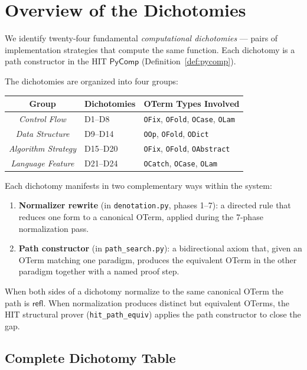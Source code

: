 \chapter{Overview of the Dichotomies}
\label{ch:dichotomy-overview}

We identify twenty-four fundamental \emph{computational dichotomies}
--- pairs of implementation strategies that compute the same function.
Each dichotomy is a path constructor in the HIT $\mathsf{PyComp}$
(Definition~\ref{def:pycomp}).

The dichotomies are organized into four groups:

\begin{center}
\begin{tabular}{c l l}
  \textbf{Group} & \textbf{Dichotomies} & \textbf{OTerm Types Involved} \\
  \hline
  \emph{Control Flow} & D1--D8 & \texttt{OFix}, \texttt{OFold}, \texttt{OCase}, \texttt{OLam} \\
  \emph{Data Structure} & D9--D14 & \texttt{OOp}, \texttt{OFold}, \texttt{ODict} \\
  \emph{Algorithm Strategy} & D15--D20 & \texttt{OFix}, \texttt{OFold}, \texttt{OAbstract} \\
  \emph{Language Feature} & D21--D24 & \texttt{OCatch}, \texttt{OCase}, \texttt{OLam} \\
\end{tabular}
\end{center}

Each dichotomy manifests in two complementary ways within the system:
\begin{enumerate}
  \item \textbf{Normalizer rewrite} (in \texttt{denotation.py}, phases 1--7):
    a directed rule that reduces one form to a canonical OTerm,
    applied during the 7-phase normalization pass.
  \item \textbf{Path constructor} (in \texttt{path\_search.py}):
    a bidirectional axiom that, given an OTerm matching one paradigm,
    produces the equivalent OTerm in the other paradigm together with
    a named proof step.
\end{enumerate}
When both sides of a dichotomy normalize to the same canonical OTerm
the path is $\mathsf{refl}$.  When normalization produces distinct
but equivalent OTerms, the HIT structural prover
(\texttt{hit\_path\_equiv}) applies the path constructor to close the
gap.

\section{Complete Dichotomy Table}


